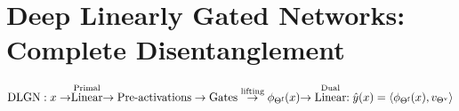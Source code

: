 \section{Deep Linearly Gated Networks: Complete Disentanglement}
{\centering $\text{DLGN} : x\rightarrow \stackrel{\text{Primal} }{\text{Linear}}\rightarrow \text{Pre-activations}\rightarrow\text{Gates}\stackrel{\text{lifting}}{\rightarrow} \phi_{\Theta^{\textrm{f}}}(x) {\rightarrow}\stackrel{\text{Dual} }{\text{Linear}}: \hat{y}(x)=\langle \phi_{\Theta^{\textrm{f}}}(x),v_{{\Theta}^{\text{v}}}\rangle$ \par}


